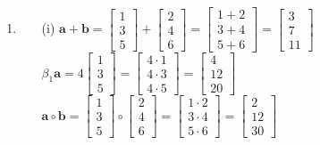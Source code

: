 \documentclass[11pt,letterpaper]{article}
\begin{document}
\begin{enumerate}
\begin{enumerate}
\item
\begin{enumerate}
\item [(i)] $\mathbf{a} + \mathbf{b} = \begin{bmatrix} 1 \\ 3 \\ 5 \end{bmatrix} + \begin{bmatrix} 2 \\ 4 \\ 6 \end{bmatrix} = \begin{bmatrix} 1 + 2 \\ 3 + 4 \\ 5 + 6 \end{bmatrix} = \begin{bmatrix} 3 \\ 7 \\ 11 \end{bmatrix}$\\
            $\beta_1 \mathbf{a} = 4 \begin{bmatrix} 1 \\ 3 \\ 5 \end{bmatrix} = \begin{bmatrix} 4 \cdot 1 \\ 4 \cdot 3 \\ 4 \cdot 5 \end{bmatrix} = \begin{bmatrix} 4 \\ 12 \\ 20 \end{bmatrix}$\\
            $\mathbf{a} \circ \mathbf{b} = \begin{bmatrix} 1 \\ 3 \\ 5 \end{bmatrix} \circ \begin{bmatrix} 2 \\ 4 \\ 6 \end{bmatrix} = \begin{bmatrix} 1 \cdot 2 \\ 3 \cdot 4 \\ 5 \cdot 6 \end{bmatrix} = \begin{bmatrix} 2 \\ 12 \\ 30 \end{bmatrix}$\\

\end{enumerate}
\end{enumerate}
\end{enumerate}
\end{document}
